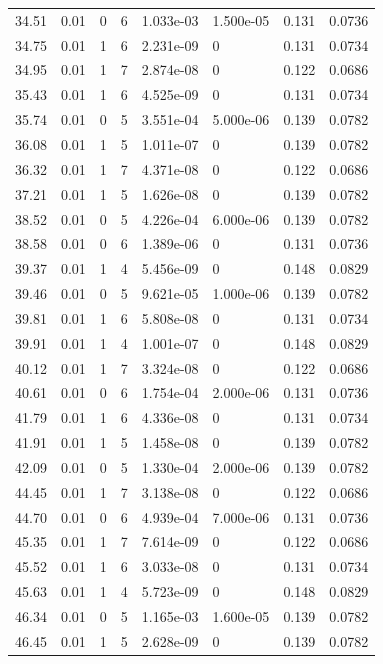 \documentclass[preview]{standalone}
\begin{document}
{{{\begin{tabular}{L{1.2cm}C{1.2cm} C{0.3cm}C{0.5cm} C{1.4cm}C{1.4cm} C{1.4cm}C{1.4cm}}
  34.51  &  0.01  & 0     &  6 &  1.033e-03  & 1.500e-05  & 0.131 &  0.0736   \\ 
  34.75  &  0.01  & 1     &  6 &  2.231e-09  & 0  & 0.131 &  0.0734   \\ 
  34.95  &  0.01  & 1     &  7 &  2.874e-08  & 0  & 0.122 &  0.0686   \\ 
  35.43  &  0.01  & 1     &  6 &  4.525e-09  & 0  & 0.131 &  0.0734   \\ 
  35.74  &  0.01  & 0     &  5 &  3.551e-04  & 5.000e-06  & 0.139 &  0.0782   \\ 
  36.08  &  0.01  & 1     &  5 &  1.011e-07  & 0  & 0.139 &  0.0782   \\ 
  36.32  &  0.01  & 1     &  7 &  4.371e-08  & 0  & 0.122 &  0.0686   \\ 
  37.21  &  0.01  & 1     &  5 &  1.626e-08  & 0  & 0.139 &  0.0782   \\ 
  38.52  &  0.01  & 0     &  5 &  4.226e-04  & 6.000e-06  & 0.139 &  0.0782   \\ 
  38.58  &  0.01  & 0     &  6 &  1.389e-06  & 0  & 0.131 &  0.0736   \\ 
  39.37  &  0.01  & 1     &  4 &  5.456e-09  & 0  & 0.148 &  0.0829   \\ 
  39.46  &  0.01  & 0     &  5 &  9.621e-05  & 1.000e-06  & 0.139 &  0.0782   \\ 
  39.81  &  0.01  & 1     &  6 &  5.808e-08  & 0  & 0.131 &  0.0734   \\ 
  39.91  &  0.01  & 1     &  4 &  1.001e-07  & 0  & 0.148 &  0.0829   \\ 
  40.12  &  0.01  & 1     &  7 &  3.324e-08  & 0  & 0.122 &  0.0686   \\ 
  40.61  &  0.01  & 0     &  6 &  1.754e-04  & 2.000e-06  & 0.131 &  0.0736   \\ 
  41.79  &  0.01  & 1     &  6 &  4.336e-08  & 0  & 0.131 &  0.0734   \\ 
  41.91  &  0.01  & 1     &  5 &  1.458e-08  & 0  & 0.139 &  0.0782   \\ 
  42.09  &  0.01  & 0     &  5 &  1.330e-04  & 2.000e-06  & 0.139 &  0.0782   \\ 
  44.45  &  0.01  & 1     &  7 &  3.138e-08  & 0  & 0.122 &  0.0686   \\ 
  44.70  &  0.01  & 0     &  6 &  4.939e-04  & 7.000e-06  & 0.131 &  0.0736   \\ 
  45.35  &  0.01  & 1     &  7 &  7.614e-09  & 0  & 0.122 &  0.0686   \\ 
  45.52  &  0.01  & 1     &  6 &  3.033e-08  & 0  & 0.131 &  0.0734   \\ 
  45.63  &  0.01  & 1     &  4 &  5.723e-09  & 0  & 0.148 &  0.0829   \\ 
  46.34  &  0.01  & 0     &  5 &  1.165e-03  & 1.600e-05  & 0.139 &  0.0782   \\ 
  46.45  &  0.01  & 1     &  5 &  2.628e-09  & 0  & 0.139 &  0.0782   \\ 
\hline 
\end{tabular} 

}}}
\end{document}
